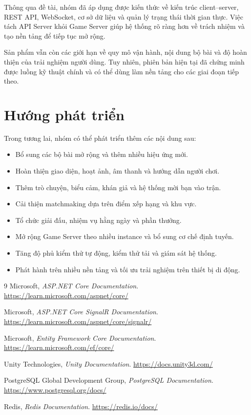 \documentclass[a4paper]{report}
\begin{document}
Thông qua đề tài, nhóm đã áp dụng được kiến thức về kiến trúc client--server,
REST API, WebSocket, cơ sở dữ liệu và quản lý trạng thái thời gian thực. Việc tách
API Server khỏi Game Server giúp hệ thống rõ ràng hơn về trách nhiệm và tạo nền
tảng để tiếp tục mở rộng.

Sản phẩm vẫn còn các giới hạn về quy mô vận hành, nội dung bộ bài và độ hoàn
thiện của trải nghiệm người dùng. Tuy nhiên, phiên bản hiện tại đã chứng minh
được luồng kỹ thuật chính và có thể dùng làm nền tảng cho các giai đoạn tiếp theo.

\chapter{Hướng phát triển}

Trong tương lai, nhóm có thể phát triển thêm các nội dung sau:

\begin{itemize}
    \item Bổ sung các bộ bài mở rộng và thêm nhiều hiệu ứng mới.
    \item Hoàn thiện giao diện, hoạt ảnh, âm thanh và hướng dẫn người chơi.
    \item Thêm trò chuyện, biểu cảm, khán giả và hệ thống mời bạn vào trận.
    \item Cải thiện matchmaking dựa trên điểm xếp hạng và khu vực.
    \item Tổ chức giải đấu, nhiệm vụ hằng ngày và phần thưởng.
    \item Mở rộng Game Server theo nhiều instance và bổ sung cơ chế định tuyến.
    \item Tăng độ phủ kiểm thử tự động, kiểm thử tải và giám sát hệ thống.
    \item Phát hành trên nhiều nền tảng và tối ưu trải nghiệm trên thiết bị di động.
\end{itemize}

\begin{thebibliography}{9}
    Microsoft,
    \textit{ASP.NET Core Documentation}.
    \url{https://learn.microsoft.com/aspnet/core/}

    Microsoft,
    \textit{ASP.NET Core SignalR Documentation}.
    \url{https://learn.microsoft.com/aspnet/core/signalr/}

    Microsoft,
    \textit{Entity Framework Core Documentation}.
    \url{https://learn.microsoft.com/ef/core/}

    Unity Technologies,
    \textit{Unity Documentation}.
    \url{https://docs.unity3d.com/}

    PostgreSQL Global Development Group,
    \textit{PostgreSQL Documentation}.
    \url{https://www.postgresql.org/docs/}

    Redis,
    \textit{Redis Documentation}.
    \url{https://redis.io/docs/}
\end{thebibliography}
\end{document}
